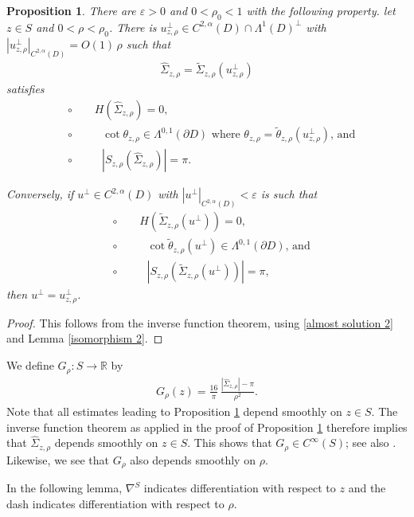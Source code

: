 \documentclass[11pt]{amsart}
\newtheorem{prop}{Proposition}
\begin{document}
\begin{prop} \label{IFT existence 2}
	There are $\varepsilon>0$ and $0<\rho_0<1$ with the following property. let $z\in S$ and $0<\rho<\rho_0$. There is  $u_{z,\rho}^\perp \in C^{2,\alpha}(D) \cap\Lambda^1(D)^\perp $ with $|u_{z,\rho}^\perp|_{C^{2,\alpha}(D)}=O(1)\,\rho$ such that 
	\begin{align} \label{IFT EXT 2 Label} 
	\hat \Sigma_{z,\rho}=\tilde \Sigma_{z,\rho}(u_{z,\rho}^\perp)
	\end{align} 
	satisfies 
	\begin{align*}
		&\circ\qquad\text{$H(\hat \Sigma_{z,\rho})=0$,}\\
		&\circ\qquad\text{ $\cot\theta_{z,\rho} \in \Lambda^{0,1}(\partial D)$ where $\theta_{z,\rho}=\tilde \theta_{z,\rho}(u^\perp_{z,\rho})$, and}\\
		&\circ\qquad\text{ $|S_{z,\rho}(\hat \Sigma_{z,\rho})|=\pi$.
		}
	\end{align*}
		
	Conversely, if $u^\perp\in C^{2,\alpha}(D)$ with $|u^\perp|_{C^{2,\alpha}(D)}<\varepsilon$ is such that
		\begin{align*}
		&\circ\qquad\text{$H(\tilde\Sigma_{z,\rho}(u^\perp))=0$,}\\
		&\circ\qquad\text{ $\cot\tilde\theta_{z,\rho}(u^\perp) \in \Lambda^{0,1}(\partial D)$, and}\\
		&\circ\qquad\text{ $| S_{z,\rho}(\tilde \Sigma_{z,\rho}(u^\perp))|=\pi$,
		}
	\end{align*}
	then $u^\perp= u_{z,\rho}^\perp$.
\end{prop}
\begin{proof}
	This follows from the inverse function theorem, using \eqref{almost solution 2} and Lemma \ref{isomorphism 2}. 
\end{proof}
We define  $G_{\rho}:S\to \mathbb{R}$ by 
\begin{align} \label{Grho} 
G_{\rho}(z)=\frac{16}{\pi}\,\frac{|\hat \Sigma_{z,\rho}|-\pi}{\rho^2}.
\end{align} 
Note that all estimates leading to Proposition \ref{IFT existence 2} depend smoothly on $z\in S$. The inverse function theorem as applied in the proof of Proposition \ref{IFT existence 2} therefore implies that $\hat \Sigma_{z,\rho}$ depends smoothly on $z\in S$. This shows that $G_\rho \in C^\infty(S)$; see also  \cite[Proposition 6]{BrendleEichmair}. Likewise, we see that $G_\rho$ also depends smoothly on $\rho$.

In the following lemma, $\nabla ^S$ indicates differentiation with respect to $z$ and the dash indicates differentiation with respect to $\rho$. 
\end{document}
